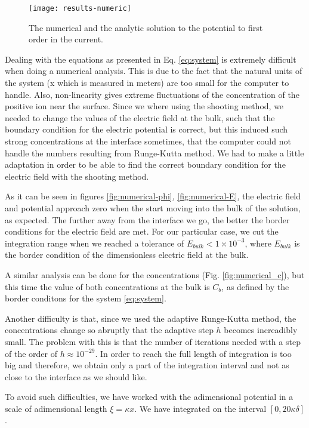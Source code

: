 \begin{figure}[htbp]
 \centering
\texttt{[image: results-numeric]}
 \caption{The numerical and the analytic solution to the potential to first order in the current.}
 \label{fig:numeric-results}
\end{figure}

Dealing with the equations as presented in Eq. \ref{eq:system} is extremely difficult when doing a numerical analysis. This is due to the fact that the natural units of the system (x which is measured in meters) are too small for the computer to handle. Also, non-linearity gives extreme fluctuations of the concentration of the positive ion near the surface. Since we where using the shooting method, we needed to change the values of the electric field at the bulk, such that the boundary condition for the electric potential is correct, but this induced such strong concentrations at the interface sometimes, that the computer could not handle the numbers resulting from Runge-Kutta method. We had to make a little adaptation in order to be able to find the correct boundary condition for the electric field with the shooting method. 




As it can be seen in figures  \ref{fig:numerical-phi},  \ref{fig:numerical-E}, the electric field and potential approach zero when the start moving into the bulk of the solution, as expected. The further away from the interface we go, the better the border conditions for the electric field are met. For our particular case, we cut the integration range when we reached a tolerance of $ E_{bulk} < 1\times 10^{-3}$, where $E_{bulk}$ is the border condition of the dimensionless electric field at the bulk. 



A similar analysis can be done for the concentrations (Fig.  \ref{fig:numerical_c}), but this time the value of both concentrations at the bulk is $C_b$, as defined by the border conditons for the system \ref{eq:system}.



Another difficulty is that, since we used the adaptive Runge-Kutta method, the concentrations change so abruptly that the adaptive step $h$ becomes increadibly small. The problem with this is that the number of iterations needed with a step of the order of $h\approx 10^{-29}$. In order to reach the full length of integration is too big and therefore, we obtain only a part of the integration interval and not as close to the interface as we should like. 

To avoid such difficulties, we have worked with the adimensional potential in a scale of adimensional length $\xi = \kappa x$. We have integrated on the interval $[0, 20 \kappa \delta]$.



